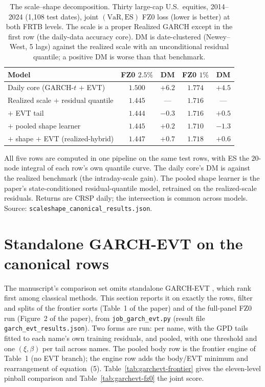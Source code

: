 \documentclass[11pt]{article}
\newcommand{\VaR}{\mathrm{VaR}}
\newcommand{\ES}{\mathrm{ES}}
\begin{document}
\begin{table}[t]
\centering
\begin{threeparttable}
\caption{The scale--shape decomposition. Thirty large-cap U.S.\ equities, 2014--2024
(1{,}108 test dates), joint $(\VaR,\ES)$ FZ0 loss (lower is better) at both FRTB
levels. The scale is a proper Realized GARCH except in the first row (the daily-data
accuracy core). DM is date-clustered (Newey--West, 5 lags) against the realized scale
with an unconditional residual quantile; a positive DM is worse than that benchmark.}
\label{tab:rgarch}
\small\setlength{\tabcolsep}{6pt}
\begin{tabular}{lcccc}
\toprule
Model & FZ0 $2.5\%$ & DM & FZ0 $1\%$ & DM \\
\midrule
Daily core (GARCH-$t$ $+$ EVT) & $1.500$ & $+6.2$ & $1.774$ & $+4.5$ \\
Realized scale $+$ residual quantile & $1.445$ & --- & $1.716$ & --- \\
\quad $+$ EVT tail & $1.444$ & $-0.3$ & $1.716$ & $+0.5$ \\
\quad $+$ pooled shape learner & $1.445$ & $+0.2$ & $1.710$ & $-1.3$ \\
\quad $+$ shape $+$ EVT (realized-hybrid) & $1.447$ & $+0.7$ & $1.718$ & $+0.6$ \\
\bottomrule
\end{tabular}
\begin{tablenotes}\footnotesize
\item All five rows are computed in one pipeline on the same test rows, with ES the
$20$-node integral of each row's own quantile curve. The daily core's DM is against the
realized benchmark (the intraday-scale gain). The pooled shape learner is the paper's
state-conditioned residual-quantile model, retrained on the realized-scale residuals.
Returns are CRSP daily; the intersection is common across models. Source:
\texttt{scaleshape\_canonical\_results.json}.
\end{tablenotes}
\end{threeparttable}
\end{table}

\clearpage
\section{Standalone GARCH-EVT on the canonical rows}\label{sec:garchevt-oa}
The manuscript's comparison set omits standalone GARCH-EVT \citep{mcneilfrey2000}, which \citet{kuester2006} rank first among classical methods. This section reports it on exactly the rows, filter and splits of the frontier sorts (Table~1 of the paper) and of the full-panel FZ0 run (Figure~2 of the paper), from \texttt{job\_garch\_evt.py} (result file \texttt{garch\_evt\_results.json}). Two forms are run: per name, with the GPD tails fitted to each name's own training residuals, and pooled, with one threshold and one $(\xi,\beta)$ per tail across names. The pooled body row is the frontier engine of Table~1 (no EVT branch); the engine row adds the body/EVT minimum and rearrangement of equation~(5). Table~\ref{tab:garchevt-frontier} gives the eleven-level pinball comparison and Table~\ref{tab:garchevt-fz0} the joint score.
\end{document}
